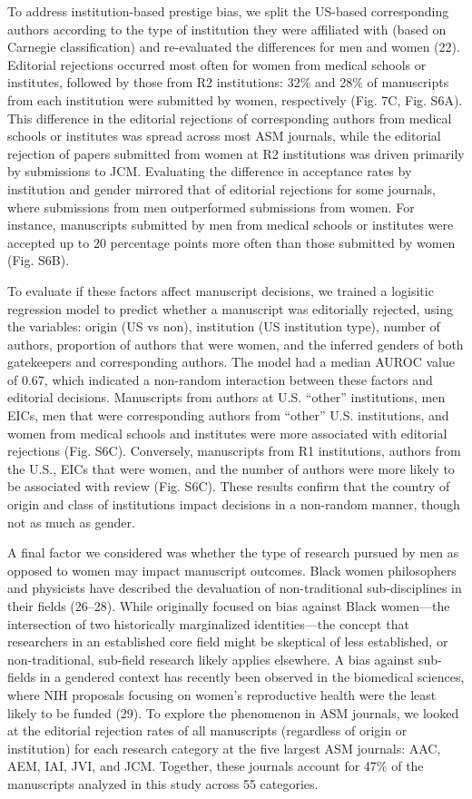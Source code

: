 \documentclass[11pt,]{article}
\begin{document}
To address institution-based prestige bias, we split the US-based
corresponding authors according to the type of institution they were
affiliated with (based on Carnegie classification) and re-evaluated the
differences for men and women (22). Editorial rejections occurred most
often for women from medical schools or institutes, followed by those
from R2 institutions: 32\% and 28\% of manuscripts from each institution
were submitted by women, respectively (Fig. 7C, Fig. S6A). This
difference in the editorial rejections of corresponding authors from
medical schools or institutes was spread across most ASM journals, while
the editorial rejection of papers submitted from women at R2
institutions was driven primarily by submissions to JCM. Evaluating the
difference in acceptance rates by institution and gender mirrored that
of editorial rejections for some journals, where submissions from men
outperformed submissions from women. For instance, manuscripts submitted
by men from medical schools or institutes were accepted up to 20
percentage points more often than those submitted by women (Fig. S6B).

To evaluate if these factors affect manuscript decisions, we trained a
logisitic regression model to predict whether a manuscript was
editorially rejected, using the variables: origin (US vs non),
institution (US institution type), number of authors, proportion of
authors that were women, and the inferred genders of both gatekeepers
and corresponding authors. The model had a median AUROC value of 0.67,
which indicated a non-random interaction between these factors and
editorial decisions. Manuscripts from authors at U.S. ``other''
institutions, men EICs, men that were corresponding authors from
``other'' U.S. institutions, and women from medical schools and
institutes were more associated with editorial rejections (Fig. S6C).
Conversely, manuscripts from R1 institutions, authors from the U.S.,
EICs that were women, and the number of authors were more likely to be
associated with review (Fig. S6C). These results confirm that the
country of origin and class of institutions impact decisions in a
non-random manner, though not as much as gender.

A final factor we considered was whether the type of research pursued by
men as opposed to women may impact manuscript outcomes. Black women
philosophers and physicists have described the devaluation of
non-traditional sub-disciplines in their fields (26--28). While
originally focused on bias against Black women---the intersection of two
historically marginalized identities---the concept that researchers in
an established core field might be skeptical of less established, or
non-traditional, sub-field research likely applies elsewhere. A bias
against sub-fields in a gendered context has recently been observed in
the biomedical sciences, where NIH proposals focusing on women's
reproductive health were the least likely to be funded (29). To explore
the phenomenon in ASM journals, we looked at the editorial rejection
rates of all manuscripts (regardless of origin or institution) for each
research category at the five largest ASM journals: AAC, AEM, IAI, JVI,
and JCM. Together, these journals account for 47\% of the manuscripts
analyzed in this study across 55 categories.
\end{document}

